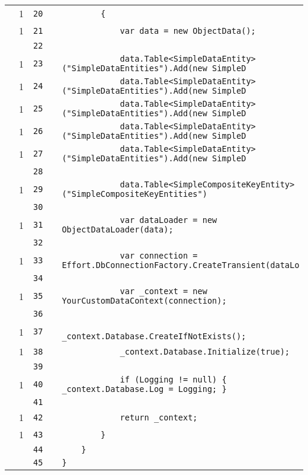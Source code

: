 \documentclass[a4paper,10pt]{article}
\begin{document}
\begin{longtable}[l]{lrrll}
\cellcolor{green} & 1 & \verb~20~ & & \verb~        {~\\
\cellcolor{green} & 1 & \verb~21~ & & \verb~            var data = new ObjectData();~\\
\cellcolor{gray} &  & \verb~22~ & & \verb~~\\
\cellcolor{green} & 1 & \verb~23~ & & \verb~            data.Table<SimpleDataEntity>("SimpleDataEntities").Add(new SimpleD~\\
\cellcolor{green} & 1 & \verb~24~ & & \verb~            data.Table<SimpleDataEntity>("SimpleDataEntities").Add(new SimpleD~\\
\cellcolor{green} & 1 & \verb~25~ & & \verb~            data.Table<SimpleDataEntity>("SimpleDataEntities").Add(new SimpleD~\\
\cellcolor{green} & 1 & \verb~26~ & & \verb~            data.Table<SimpleDataEntity>("SimpleDataEntities").Add(new SimpleD~\\
\cellcolor{green} & 1 & \verb~27~ & & \verb~            data.Table<SimpleDataEntity>("SimpleDataEntities").Add(new SimpleD~\\
\cellcolor{gray} &  & \verb~28~ & & \verb~~\\
\cellcolor{green} & 1 & \verb~29~ & & \verb~            data.Table<SimpleCompositeKeyEntity>("SimpleCompositeKeyEntities")~\\
\cellcolor{gray} &  & \verb~30~ & & \verb~~\\
\cellcolor{green} & 1 & \verb~31~ & & \verb~            var dataLoader = new ObjectDataLoader(data);~\\
\cellcolor{gray} &  & \verb~32~ & & \verb~~\\
\cellcolor{green} & 1 & \verb~33~ & & \verb~            var connection = Effort.DbConnectionFactory.CreateTransient(dataLo~\\
\cellcolor{gray} &  & \verb~34~ & & \verb~~\\
\cellcolor{green} & 1 & \verb~35~ & & \verb~            var _context = new YourCustomDataContext(connection);~\\
\cellcolor{gray} &  & \verb~36~ & & \verb~~\\
\cellcolor{green} & 1 & \verb~37~ & & \verb~            _context.Database.CreateIfNotExists();~\\
\cellcolor{green} & 1 & \verb~38~ & & \verb~            _context.Database.Initialize(true);~\\
\cellcolor{gray} &  & \verb~39~ & & \verb~~\\
\cellcolor{green} & 1 & \verb~40~ & & \verb~            if (Logging != null) { _context.Database.Log = Logging; }~\\
\cellcolor{gray} &  & \verb~41~ & & \verb~~\\
\cellcolor{green} & 1 & \verb~42~ & & \verb~            return _context;~\\
\cellcolor{green} & 1 & \verb~43~ & & \verb~        }~\\
\cellcolor{gray} &  & \verb~44~ & & \verb~    }~\\
\cellcolor{gray} &  & \verb~45~ & & \verb~}~\\
\end{longtable}
\newpage
\end{document}
